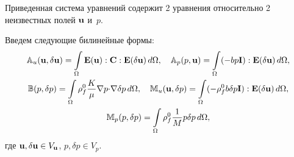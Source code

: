 Приведенная система уравнений содержит 2 уравнения относительно 2 неизвестных полей
$\mathbf{u}$ и~$p$.


Введем следующие билинейные формы:
%
\begin{equation}
\label{eq:weak:forms}
\begin{gathered}
\mathbb{A}_u(\vc{u},\delta\vc{u}) = \int\limits_\Omega \tn{E}(\vc{u}):\tn{C}:\tn{E}(\delta\vc{u}) \,d\Omega, \quad
\mathbb{A}_p(p,\vc{u}) = \int\limits_\Omega (-bp\tn{I}):\tn{E}(\delta\vc{u})\, d\Omega,\\
%
\mathbb{B}(p, \delta p) = \int\limits_\Omega \rho_f^0\frac{K}{\mu} \nabla p \dpr \nabla \delta p\, d\Omega,\quad
\mathbb{M}_u(\vc{u},\delta p) = \int\limits_\Omega (-\rho_f^0 b\delta p  \tn{I} ):\tn{E}(\delta\vc{u})\, d\Omega,\\
%
\mathbb{M}_p(p,\delta p) = \int\limits_\Omega \rho^0_f \frac{1}{M} p\delta p \, d\Omega,
%
\end{gathered}
\end{equation}
%
где $\mathbf{u}, \delta\mathbf{u}\in V_{\mathbf{u}}$, 
$p,\delta p\in V_{p}$.


